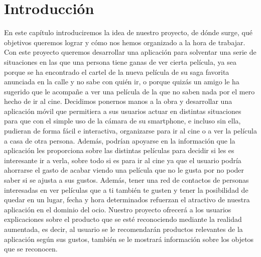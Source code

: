 
\cleardoublepage


\chapter{Introducción}
\label{makereference}


    En este capítulo introduciremos la idea de nuestro proyecto, de dónde surge, qué objetivos queremos lograr y cómo nos hemos organizado a la hora de trabajar.
    Con este proyecto queremos desarrollar una aplicación para solventar una serie de situaciones en las que una persona
    tiene ganas de ver cierta película, ya sea porque se ha encontrado el cartel de la nueva película
    de su saga favorita anunciada en la calle y no sabe con quién ir, o porque quizás un amigo le ha sugerido que le acompañe
    a ver una película de la que no saben nada por el mero hecho de ir al cine. 
    Decidimos ponernos manos a la obra y desarrollar una aplicación móvil que permitiera a sus usuarios actuar en distintas situaciones
    para que con el simple uso de la cámara de su smartphone, e incluso sin ella, pudieran de forma
    fácil e interactiva, organizarse para ir al cine o a ver la película a casa de otra persona. Además, podrían apoyarse en la 
    información que la aplicación les proporciona sobre las distintas películas para decidir si les es interesante ir a verla, sobre todo 
    si es para ir al cine ya que el usuario podría ahorrarse el gasto de acabar viendo una película que no le gusta por no poder saber si se 
    ajusta a sus gustos. Además, tener una red de contactos de personas interesadas en ver películas que a ti también te gusten y tener la posibilidad
    de quedar en un lugar, fecha y hora determinados refuerzan el atractivo de nuestra aplicación en el dominio del ocio.
    Nuestro proyecto ofrecerá a los usuarios explicaciones sobre el producto que se esté reconociendo mediante la realidad aumentada, es decir, al usuario se le 
    recomendarán productos relevantes de la aplicación según sus gustos, también se le mostrará información sobre los objetos que se reconocen.

